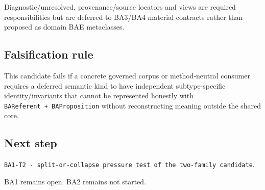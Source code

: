 \documentclass[
]{article}
\begin{document}
Diagnostic/unresolved, provenance/source locators and views are required
responsibilities but are deferred to BA3/BA4 material contracts rather
than proposed as domain BAE metaclasses.

\subsection{Falsification rule}\label{falsification-rule}

This candidate fails if a concrete governed corpus or method-neutral
consumer requires a deferred semantic kind to have independent
subtype-specific identity/invariants that cannot be represented honestly
with \texttt{BAReferent\ +\ BAProposition} without reconstructing
meaning outside the shared core.

\subsection{Next step}\label{next-step}

\texttt{BA1-T2\ -\ split-or-collapse\ pressure\ test\ of\ the\ two-family\ candidate}.

BA1 remains open. BA2 remains not started.
\end{document}
